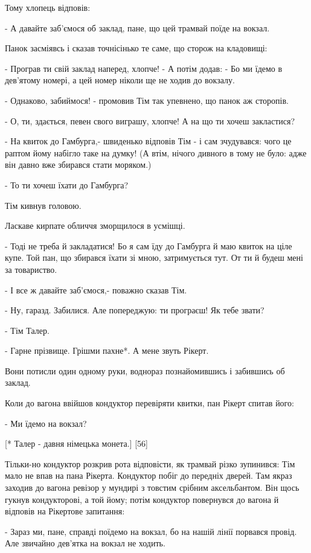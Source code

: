 Тому хлопець відповів:

- А давайте заб'ємося об заклад, пане, що цей трамвай поїде на вокзал.

Панок засміявсь і сказав точнісінько те саме, що сторож на кладовищі:

- Програв ти свій заклад наперед, хлопче! - А потім додав: - Бо ми їдемо в дев'ятому номері, а цей номер ніколи ще не ходив до вокзалу.

- Однаково, забиймося! - промовив Тім так упевнено, що панок аж сторопів.

- О, ти, здається, певен свого виграшу, хлопче! А на що ти хочеш закластися?

- На квиток до Гамбурга,- швиденько відповів Тім - і сам зчудувався: чого це раптом йому набігло таке на думку! (А втім, нічого дивного в тому не було: адже він давно вже збирався стати моряком.)

- То ти хочеш їхати до Гамбурга?

Тім кивнув головою.

Ласкаве кирпате обличчя зморщилося в усмішці.

- Тоді не треба й закладатися! Бо я сам їду до Гамбурга й маю квиток на ціле купе. Той пан, що збирався їхати зі мною, затримується тут. От ти й будеш мені за товариство.

- І все ж давайте заб'ємося,- поважно сказав Тім.

- Ну, гаразд. Забилися. Але попереджую: ти програєш! Як тебе звати?

- Тім Талер.

- Гарне прізвище. Грішми пахне*. А мене звуть Рікерт.

Вони потисли один одному руки, воднораз познайомившись і забившись об заклад.

Коли до вагона ввійшов кондуктор перевіряти квитки, пан Рікерт спитав його:

- Ми їдемо на вокзал?

[* Талер - давня німецька монета.] [56]

Тільки-но кондуктор розкрив рота відповісти, як трамвай різко зупинився: Тім мало не впав на пана Рікерта. Кондуктор побіг до передніх дверей. Там якраз заходив до вагона ревізор у мундирі з товстим срібним аксельбантом. Він щось гукнув кондукторові, а той йому; потім кондуктор повернувся до вагона й відповів на Рікертове запитання:

- Зараз ми, пане, справді поїдемо на вокзал, бо на нашій лінії порвався провід. Але звичайно дев'ятка на вокзал не ходить.

